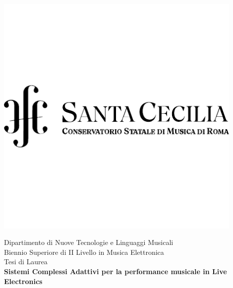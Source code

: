
\begin{center}

\includegraphics[width=12cm]{figures/logo-CSC-pdf-cropped.pdf} \\
\vspace{1cm}

{\Large {Dipartimento di Nuove Tecnologie e Linguaggi
Musicali}} \\ 


{\Large {Biennio Superiore di II Livello in Musica Elettronica}} \\[2.5cm]

{\Large {Tesi di Laurea}} \\[0.5cm]

{\LARGE \textbf{Sistemi Complessi Adattivi per la performance musicale in Live Electronics}} \\[2cm]

\end{center}

